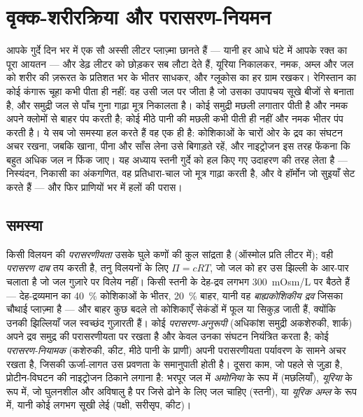\chapter{वृक्क-शरीरक्रिया और परासरण-नियमन}\label{ch:b3:renal-osmoregulation}

आपके गुर्दे दिन भर में एक सौ अस्सी लीटर प्लाज़्मा छानते हैं --- यानी
हर आधे घंटे में आपके रक्त का पूरा आयतन --- और डेढ़ लीटर को छोड़कर सब
लौटा देते हैं, यूरिया निकालकर, नमक, अम्ल और जल को शरीर की ज़रूरत के
प्रतिशत भर के भीतर साधकर, और ग्लूकोस का हर ग्राम रखकर। रेगिस्तान का कोई
कंगारू चूहा कभी पीता ही नहीं: वह उसी जल पर जीता है जो उसका उपापचय सूखे
बीजों से बनाता है, और समुद्री जल से पाँच गुना गाढ़ा मूत्र निकालता है।
कोई समुद्री मछली लगातार पीती है और नमक अपने क्लोमों से बाहर पंप करती
है; कोई मीठे पानी की मछली कभी पीती ही नहीं और नमक भीतर पंप करती है। ये
सब जो समस्या हल करते हैं वह एक ही है: कोशिकाओं के चारों ओर के द्रव का
संघटन अचर रखना, जबकि खाना, पीना और साँस लेना उसे बिगाड़ते रहें, और
नाइट्रोजन इस तरह फेंकना कि बहुत अधिक जल न फिंक जाए। यह अध्याय स्तनी
गुर्दे को हल किए गए उदाहरण की तरह लेता है --- निस्यंदन, निकासी का
अंकगणित, वह प्रतिधारा-चाल जो मूत्र गाढ़ा करती है, और वे हॉर्मोन जो
सुइयाँ सेट करते हैं --- और फिर प्राणियों भर में हलों की परास।

\section{समस्या}

\begin{definition}\label{def:b3:renal-osmoregulation:problem}
किसी विलयन की \emph{परासरणीयता} उसके घुले कणों की कुल सांद्रता है
(ऑस्मोल प्रति लीटर में); वही \emph{परासरण दाब} तय करती है, तनु विलयनों
के लिए $\Pi = cRT$, जो जल को हर उस झिल्ली के आर-पार चलाता है जो जल
गुज़ारे पर विलेय नहीं। किसी स्तनी के देह-द्रव लगभग \qty{300}{mOsm/L}
पर बैठते हैं --- देह-द्रव्यमान का \qty{40}{\%} कोशिकाओं के भीतर,
\qty{20}{\%} बाहर, यानी वह \emph{बाह्यकोशिकीय द्रव} जिसका चौथाई
प्लाज़्मा है --- और बाहर कुछ बदले तो कोशिकाएँ सेकंडों में फूल या सिकुड़
जाती हैं, क्योंकि उनकी झिल्लियाँ जल स्वच्छंद गुज़ारती हैं। कोई
\emph{परासरण-अनुरूपी} (अधिकांश समुद्री अकशेरुकी, शार्क) अपने द्रव
समुद्र की परासरणीयता पर रखता है और केवल उनका संघटन नियंत्रित करता है;
कोई \emph{परासरण-नियामक} (कशेरुकी, कीट, मीठे पानी के प्राणी) अपनी
परासरणीयता पर्यावरण के सामने अचर रखता है, जिसकी ऊर्जा-लागत उस प्रवणता
के समानुपाती होती है। दूसरा काम, जो पहले से जुड़ा है, प्रोटीन-विघटन की
नाइट्रोजन ठिकाने लगाना है: भरपूर जल में \emph{अमोनिया} के रूप में
(मछलियाँ), \emph{यूरिया} के रूप में, जो घुलनशील और अविषालु है पर जिसे
ढोने के लिए जल चाहिए (स्तनी), या \emph{यूरिक अम्ल} के रूप में, यानी
कोई लगभग सूखी लेई (पक्षी, सरीसृप, कीट)।
\end{definition}


